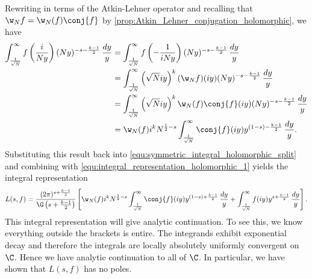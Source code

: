       Rewriting in terms of the Atkin-Lehner operator and recalling that $\w_{N}f = \w_{N}(f)\conj{f}$ by \cref{prop:Atkin_Lehner_conjugation_holomorphic}, we have
      \begin{align*}
        \int_{\frac{1}{\sqrt{N}}}^{\infty}f\left(\frac{i}{Ny}\right)(Ny)^{-s-\frac{k-1}{2}}\,\frac{dy}{y} &= \int_{\frac{1}{\sqrt{N}}}^{\infty}f\left(-\frac{1}{iNy}\right)(Ny)^{-s-\frac{k-1}{2}}\,\frac{dy}{y} \\
        &= \int_{\frac{1}{\sqrt{N}}}^{\infty}\left(\sqrt{N}iy\right)^{k}(\w_{N}f)(iy)(Ny)^{-s-\frac{k-1}{2}}\,\frac{dy}{y} \\
        &= \int_{\frac{1}{\sqrt{N}}}^{\infty}\left(\sqrt{N}iy\right)^{k}\w_{N}(f)\conj{f}(iy)(Ny)^{-s-\frac{k-1}{2}}\,\frac{dy}{y} \\
        &= \w_{N}(f)i^{k}N^{\frac{1}{2}-s}\int_{\frac{1}{\sqrt{N}}}^{\infty}\conj{f}(iy)y^{(1-s)-\frac{k-1}{2}}\,\frac{dy}{y}.
      \end{align*}
      Substituting this result back into \cref{equ:symmetric_integral_holomorphic_split} and combining with \cref{equ:integral_representation_holomorphic_1} yields the integral representation
      \begin{equation}\label{equ:integral_representation_holomorphic_final}
        L(s,f) = \frac{(2\pi)^{s+\frac{k-1}{2}}}{\G\left(s+\frac{k-1}{2}\right)}\left[\w_{N}(f)i^{k}N^{\frac{1}{2}-s}\int_{\frac{1}{\sqrt{N}}}^{\infty}\conj{f}(iy)y^{(1-s)+\frac{k-1}{2}}\,\frac{dy}{y}+\int_{\frac{1}{\sqrt{N}}}^{\infty}f(iy)y^{s+\frac{k-1}{2}}\,\frac{dy}{y}\right].
      \end{equation}
      This integral representation will give analytic continuation. To see this, we know everything outside the brackets is entire. The integrands exhibit exponential decay and therefore the integrals are locally absolutely uniformly convergent on $\C$. Hence we have analytic continuation to all of $\C$. In particular, we have shown that $L(s,f)$ has no poles.
